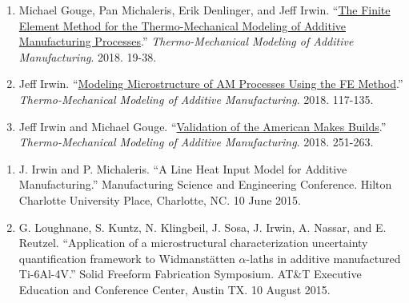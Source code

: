 \documentclass[10.5pt,letterpaper]{article}
\begin{document}
\begin{enumerate}[leftmargin=*]
	\setlength{\parskip}{0em}
	\item Michael Gouge, Pan Michaleris, Erik Denlinger, and Jeff Irwin.  ``\href{https://www.sciencedirect.com/science/article/pii/B9780128118207000033}{The Finite Element Method for the Thermo-Mechanical Modeling of Additive Manufacturing Processes}.'' \emph{Thermo-Mechanical Modeling of Additive Manufacturing}. 2018. 19-38.
	\item Jeff Irwin.  ``\href{https://www.sciencedirect.com/science/article/pii/B9780128118207000094}{Modeling Microstructure of AM Processes Using the FE Method}.'' \emph{Thermo-Mechanical Modeling of Additive Manufacturing}. 2018. 117-135.
	\item Jeff Irwin and Michael Gouge.  ``\href{https://www.sciencedirect.com/science/article/pii/B9780128118207000185}{Validation of the American Makes Builds}.'' \emph{Thermo-Mechanical Modeling of Additive Manufacturing}. 2018. 251-263.
\end{enumerate}

\spacedhrule{0.5em}{-0.5em}
\begin{enumerate}[leftmargin=*]
	\setlength{\parskip}{0em}
	\item J. Irwin and P. Michaleris. ``A Line Heat Input Model for Additive Manufacturing.'' Manufacturing Science and Engineering Conference. Hilton Charlotte University Place, Charlotte, NC. 10 June 2015.
	\item G. Loughnane, S. Kuntz, N. Klingbeil, J. Sosa, J. Irwin, A. Nassar, and E. Reutzel. ``Application of a microstructural characterization uncertainty quantification framework to Widmanst\"atten $\alpha$-laths in additive manufactured Ti-6Al-4V.'' Solid Freeform Fabrication Symposium. AT\&T Executive Education and Conference Center, Austin TX. 10 August 2015.
\end{enumerate}
\end{document}
